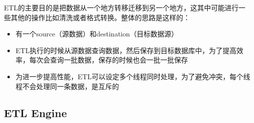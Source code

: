 \documentclass[12pt]{article}
\begin{document}
ETL的主要目的是把数据从一个地方转移迁移到另一个地方，这其中可能进行一些其他的操作比如清洗或者格式转换。整体的思路是这样的：

\begin{itemize}
\tightlist
\item
  有一个source（源数据）和destination（目标数据源）
\item
  ETL执行的时候从源数据查询数据，然后保存到目标数据库中，为了提高效率，每次会查询一批数据，保存的时候也会一批一批保存
\item
  为进一步提高性能，ETL可以设定多个线程同时处理，为了避免冲突，每个线程不会处理同一条数据，是互斥的
\end{itemize}

\subsection{ETL Engine}\label{etl-engine}
\end{document}
